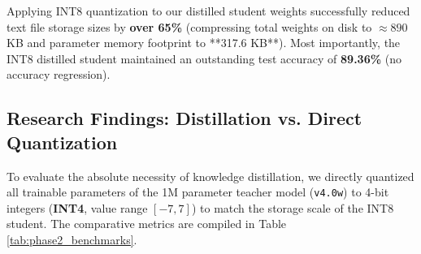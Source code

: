 \documentclass[12pt,a4paper]{article}
\begin{document}
Applying INT8 quantization to our distilled student weights successfully reduced text file storage sizes by \textbf{over 65\%} (compressing total weights on disk to $\approx 890$ KB and parameter memory footprint to **317.6 KB**). Most importantly, the INT8 distilled student maintained an outstanding test accuracy of \textbf{89.36\%} (no accuracy regression).

\subsection{Research Findings: Distillation vs. Direct Quantization}
To evaluate the absolute necessity of knowledge distillation, we directly quantized all trainable parameters of the 1M parameter teacher model (\texttt{v4.0w}) to 4-bit integers (\textbf{INT4}, value range $[-7, 7]$) to match the storage scale of the INT8 student. The comparative metrics are compiled in Table \ref{tab:phase2_benchmarks}.

\begin{table}[H]
    \centering
    \caption{Phase 2 Comparative Model Benchmarks}
    \label{tab:phase2_benchmarks}
\end{table}
\end{document}
